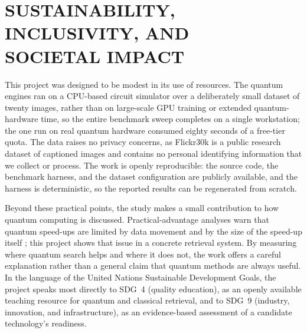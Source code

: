 \chapter[SUSTAINABILITY, INCLUSIVITY, AND SOCIETAL IMPACT]{SUSTAINABILITY, INCLUSIVITY, AND\\SOCIETAL IMPACT}
\label{ch:sustainability}


This project was designed to be modest in its use of resources. The quantum
engines ran on a CPU-based circuit simulator over a deliberately small dataset of
twenty images, rather than on large-scale GPU training or extended
quantum-hardware time, so the entire benchmark sweep completes on a single
workstation; the one run on real quantum hardware consumed eighty seconds of a
free-tier quota. The data raises no privacy concerns, as Flickr30k is a public
research dataset of captioned images and contains no personal identifying
information that we collect or process. The work is openly reproducible: the
source code, the benchmark harness, and the dataset configuration are publicly
available, and the harness is deterministic, so the reported results can be
regenerated from scratch.

Beyond these practical points, the study makes a small contribution to how
quantum computing is discussed. Practical-advantage analyses warn that quantum
speed-ups are limited by data movement and by the size of the speed-up itself
\cite{hoefler2023practicality}; this project shows that issue in a concrete
retrieval system. By measuring where quantum search helps and where it does not,
the work offers a careful explanation rather than a general claim that quantum
methods are always useful. In the language of the United Nations Sustainable
Development Goals, the project speaks most directly to SDG~4 (quality education),
as an openly available teaching resource for quantum and classical retrieval, and
to SDG~9 (industry, innovation, and infrastructure), as an evidence-based
assessment of a candidate technology's readiness.
